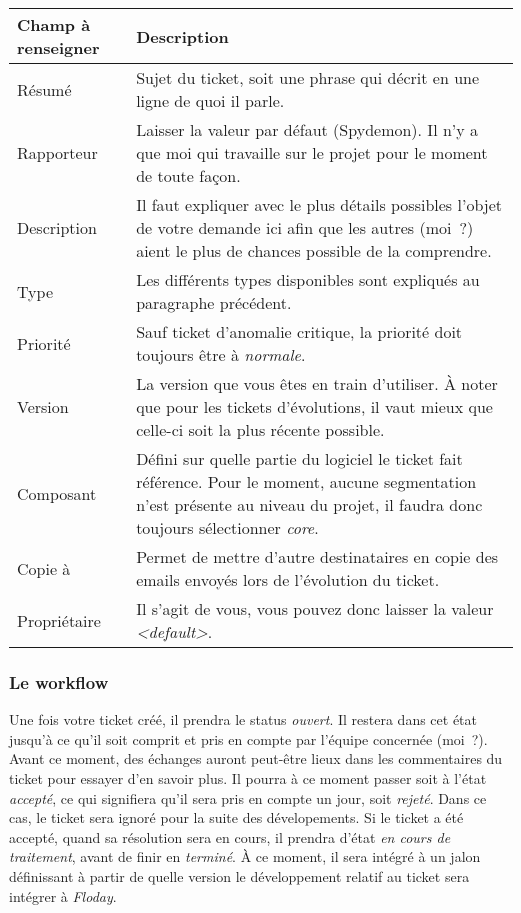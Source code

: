 \begin{tabular}{|p{3cm}|p{10cm}|}
	\hline
	Champ à renseigner & Description\\
	\hline
	Résumé & Sujet du ticket, soit une phrase qui décrit en une ligne de quoi il parle.\\
	Rapporteur & Laisser la valeur par défaut (Spydemon). Il n'y a que moi qui travaille sur le projet pour le moment de toute façon.\\
	Description & Il faut expliquer avec le plus détails possibles l'objet de votre demande ici afin que les autres (moi~?) aient le plus de chances possible de la comprendre.\\
	Type & Les différents types disponibles sont expliqués au paragraphe précédent.\\
	Priorité & Sauf ticket d'anomalie critique, la priorité doit toujours être à \emph{normale}.\\
	Version & La version que vous êtes en train d'utiliser. À noter que pour les tickets d'évolutions, il vaut mieux que celle-ci soit la plus récente possible.\\
	Composant & Défini sur quelle partie du logiciel le ticket fait référence. Pour le moment, aucune segmentation n'est présente au niveau du projet, il faudra donc toujours sélectionner \emph{core}.\\
	Copie à & Permet de mettre d'autre destinataires en copie des emails envoyés lors de l'évolution du ticket.\\
	Propriétaire & Il s'agit de vous, vous pouvez donc laisser la valeur \emph{<default>}.\\
	\hline
\end{tabular}
\newline

\subsubsection{Le workflow}

Une fois votre ticket créé, il prendra le status \emph{ouvert}.
Il restera dans cet état jusqu'à ce qu'il soit comprit et pris en compte par l'équipe concernée (moi~?).
Avant ce moment, des échanges auront peut-être lieux dans les commentaires du ticket pour essayer d'en savoir plus.
Il pourra à ce moment passer soit à l'état \emph{accepté}, ce qui signifiera qu'il sera pris en compte un jour, soit \emph{rejeté}.
Dans ce cas, le ticket sera ignoré pour la suite des dévelopements.
Si le ticket a été accepté, quand sa résolution sera en cours, il prendra d'état \emph{en cours de traitement}, avant de finir en \emph{terminé}.
À ce moment, il sera intégré à un jalon définissant à partir de quelle version le développement relatif au ticket sera intégrer à \emph{Floday}.

